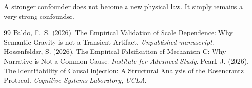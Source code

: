 \documentclass[12pt,a4paper]{article}
\begin{document}
A stronger confounder does not become a new physical law. It simply remains a very strong confounder.

\begin{thebibliography}{99}
 Baldo, F.~S. (2026). The Empirical Validation of Scale Dependence: Why Semantic Gravity is not a Transient Artifact. \emph{Unpublished manuscript}.
 Hossenfelder, S. (2026). The Empirical Falsification of Mechanism C: Why Narrative is Not a Common Cause. \emph{Institute for Advanced Study}.
 Pearl, J. (2026). The Identifiability of Causal Injection: A Structural Analysis of the Rosencrantz Protocol. \emph{Cognitive Systems Laboratory, UCLA}.
\end{thebibliography}
\end{document}
